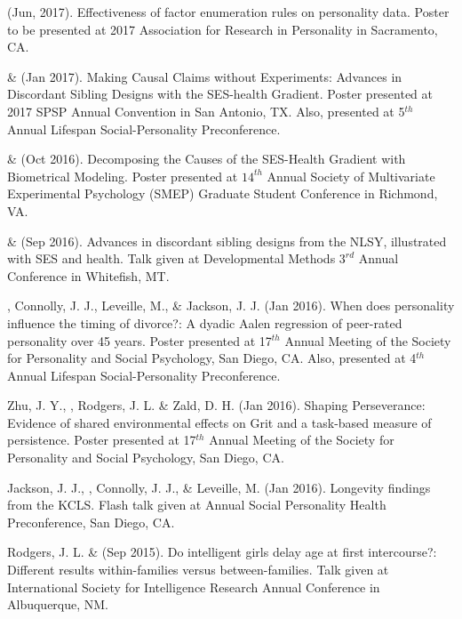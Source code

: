 \item\meb (Jun, 2017). Effectiveness of factor enumeration rules on personality data.  Poster to be presented at  2017 Association for Research in Personality in Sacramento, CA.

\item\meb \& \joe (Jan 2017). Making Causal Claims without Experiments: Advances in Discordant Sibling Designs with the SES-health Gradient. Poster presented at 2017 SPSP Annual Convention in San Antonio, TX. Also, presented at 5$^{th}$ Annual Lifespan Social-Personality  Preconference.

\item\meb \& \joe (Oct 2016). Decomposing the Causes of the SES-Health Gradient with Biometrical Modeling. Poster presented at $14^{th}$ Annual Society of Multivariate Experimental Psychology (SMEP) Graduate Student Conference in Richmond, VA.
%
\item\meb \& \joe (Sep 2016). Advances in discordant sibling designs from the NLSY, illustrated with SES and health. Talk given at Developmental Methods $3^{rd}$ Annual Conference in Whitefish, MT.
%
\item \meb, Connolly, J. J., Leveille, M., \& Jackson, J. J. (Jan 2016). When does personality influence the timing of divorce?: A dyadic Aalen regression of peer-rated personality over 45 years. Poster presented at 17$^{th}$ Annual Meeting of the Society for Personality and Social Psychology, San Diego, CA. Also, presented at 4$^{th}$ Annual Lifespan Social-Personality  Preconference.
%
\item Zhu, J. Y., \meb, Rodgers, J. L. \& Zald, D. H. (Jan 2016). Shaping Perseverance: Evidence of shared environmental effects on Grit and a task-based measure of persistence. Poster presented at 17$^{th}$ Annual Meeting of the Society for Personality and Social Psychology, San Diego, CA.
\item Jackson, J. J., \meb, Connolly, J. J., \& Leveille, M. (Jan 2016). Longevity findings from the KCLS. Flash talk given at Annual Social Personality Health Preconference, San Diego, CA. %
%
\item Rodgers, J. L. \& \meb (Sep 2015). Do intelligent girls delay age at first intercourse?:  Different results within-families versus between-families. Talk given at International Society for Intelligence Research Annual Conference in Albuquerque, NM.
